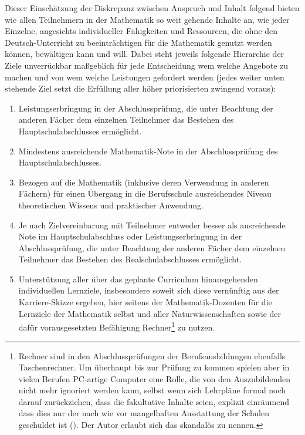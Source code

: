 \documentclass[a4paper]{book}%
\theoremstyle{definition}
\begin{document}
Dieser Einschätzung der Diskrepanz zwischen Anspruch und Inhalt folgend bieten wie allen Teilnehmern in der Mathematik so weit gehende Inhalte an, wie jeder Einzelne, angesichts individueller Fähigkeiten und Ressourcen, die ohne den Deutsch-Unterricht zu beeinträchtigen für die Mathematik genutzt werden können, bewältigen kann und will. Dabei steht jeweils folgende Hierarchie der Ziele unverrückbar maßgeblich für jede Entscheidung wem welche Angebote zu machen und von wem welche Leistungen gefordert werden (jedes weiter unten stehende Ziel setzt die Erfüllung aller höher priorisierten zwingend voraus):
\begin{enumerate}
  \item Leistungserbringung in der Abschlussprüfung, die unter Beachtung der anderen Fächer dem einzelnen Teilnehmer das Bestehen des Hauptschulabschlusses ermöglicht.
  \item Mindestens ausreichende Mathematik-Note in der Abschlussprüfung des Hauptschulabschlusses.
  \item Bezogen auf die Mathematik (inklusive deren Verwendung in anderen Fächern) für einen Übergang in die Berufsschule ausreichendes Niveau theoretischen Wissens und praktischer Anwendung.
  \item Je nach Zielvereinbarung mit Teilnehmer entweder besser als ausreichende Note im Hauptschulabschluss oder Leistungserbringung in der Abschlussprüfung, die unter Beachtung der anderen Fächer dem einzelnen Teilnehmer das Bestehen des Realschulabschlusses ermöglicht.
  \item Unterstützung aller über das geplante Curriculum hinausgehenden individuellen Lernziele, insbesondere soweit sich diese vernünftig aus der Karriere-Skizze ergeben, hier seitens der Mathematik-Dozenten für die Lernziele der Mathematik selbst und aller Naturwissenschaften sowie der dafür vorausgesetzten Befähigung Rechner\footnote{Rechner sind in den Abschlussprüfungen der Berufsausbildungen ebenfalls Taschenrechner. Um überhaupt bis zur Prüfung zu kommen spielen aber in vielen Berufen PC-artige Computer eine Rolle, die von den Auszubildenden nicht mehr ignoriert werden kann, selbst wenn sich Lehrpläne formal noch darauf zurückziehen, dass die fakultative Inhalte seien, explizit einräumend dass dies nur der nach wie vor mangelhaften Ausstattung der Schulen geschuldet ist (\citep[S. 6]{LehrplanMathematikRealschuleHessen2017}). Der Autor erlaubt sich das skandalös zu nennen.} zu nutzen.
\end{enumerate}
\end{document}
